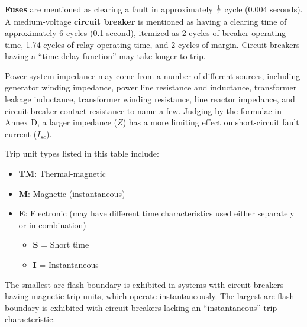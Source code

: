 





 






{\bf Fuses} are mentioned as clearing a fault in approximately $1 \over 4$ cycle (0.004 seconds).  A medium-voltage {\bf circuit breaker} is mentioned as having a clearing time of approximately 6 cycles (0.1 second), itemized as 2 cycles of breaker operating time, 1.74 cycles of relay operating time, and 2 cycles of margin.  Circuit breakers having a ``time delay function'' may take longer to trip.

\vskip 10pt

Power system impedance may come from a number of different sources, including generator winding impedance, power line resistance and inductance, transformer leakage inductance, transformer winding resistance, line reactor impedance, and circuit breaker contact resistance to name a few.  Judging by the formulae in Annex D, a larger impedance ($Z$) has a more limiting effect on short-circuit fault current ($I_{sc}$).

\vskip 10pt

Trip unit types listed in this table include:

\begin{itemize}
\item{} {\bf TM}: Thermal-magnetic
\item{} {\bf M}: Magnetic (instantaneous)
\item{} {\bf E}: Electronic (may have different time characteristics used either separately or in combination)
\begin{itemize}

\item{} {\bf S} = Short time 
\item{} {\bf I} = Instantaneous
\end{itemize}
\end{itemize}

The smallest arc flash boundary is exhibited in systems with circuit breakers having magnetic trip units, which operate instantaneously.  The largest arc flash boundary is exhibited with circuit breakers lacking an ``instantaneous'' trip characteristic.





